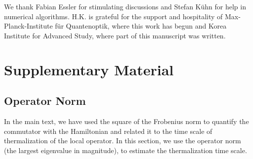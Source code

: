 \documentclass[twocolumn,superscriptaddress, prb]{revtex4-1}
\begin{document}
We thank Fabian Essler for stimulating discussions and Stefan K\"{u}hn for help in numerical algorithms.
H.K. is grateful for the support and hospitality of Max-Planck-Institute f\"{u}r Quantenoptik,
where this work has begun and Korea Institute for Advanced Study, where part of this manuscript was written.




\newpage
\section*{Supplementary Material}

\subsection{Operator Norm}
In the main text, we have used the square of the Frobenius norm to quantify the commutator with the Hamiltonian
and related it to the time scale of thermalization of the local operator.
In this section, we use the operator norm (the largest eigenvalue in magnitude),
to estimate the thermalization time scale.
\end{document}
